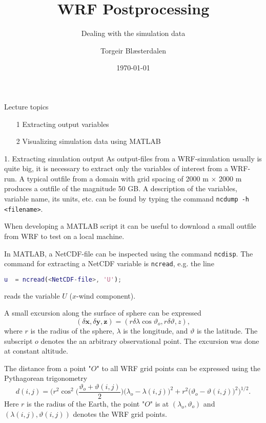 \documentclass{beamer}
\title{WRF Postprocessing}
\subtitle{Dealing with the simulation data}
\author{Torgeir Blæsterdalen}
\institute{Department of Industrial Engineering, UiT-The Arctic University of Norway}
\date{\today}
\newcommand{\yb}{\bm {y}\xspace}						%
\newcommand{\xb}{\bm {x}\xspace}						%
\newcommand{\zb}{\bm {z}\xspace}						%
\begin{document}
\begin{frame}
\titlepage
\end{frame}

\begin{frame}{Lecture topics}
\begin{enumerate}
	\item[1] Extracting output variables
	\item[2] Visualizing simulation data using MATLAB
\end{enumerate}
\end{frame}


\begin{frame}[fragile, allowframebreaks=1, t]{1. Extracting simulation output}
As output-files from a WRF-simulation usually is quite big, it is necessary to extract only the variables of interest from a WRF-run. A typical outfile from a domain with grid spacing of 2000 m $\times$ 2000 m produces a outfile of the magnitude 50 GB. 
A description of the variables, variable name, its units, etc. can be found by typing the command \texttt{ncdump -h <filename>}. 

When developing a MATLAB script it can be useful to download a small outfile from WRF to test on a local machine.

In MATLAB, a NetCDF-file can be inspected using the command \texttt{ncdisp}. The command for extracting a NetCDF variable is \texttt{ncread}, e.g. the line 
\begin{lstlisting}[language=MATLAB]
u  = ncread(<NetCDF-file>, 'U'); 
\end{lstlisting}
reads the variable $U$ ($x$-wind component). 

A small excursion along the surface of sphere can be expressed 
\begin{equation*}
(\delta \xb,\delta \yb, \zb) = (r\delta \lambda \cos \vartheta_o, r\delta\vartheta, z),	
\end{equation*} 
where $r$ is the radius of the sphere, $\lambda$ is the longitude, and $\vartheta$ is the latitude. The subscript $o$ denotes the an arbitrary observational point. The excursion was done at constant altitude. 

The distance from a point "$O$" to all WRF grid points can be expressed using the Pythagorean trigonometry 
\begin{equation}
d(i,j) = \Bigg(r^2\cos^2\bigg(\frac{\vartheta_o + \vartheta(i,j)}{2}\bigg)\big(\lambda_o-\lambda(i,j)\big)^2 + r^2\big(\vartheta_o - \vartheta(i,j)\big)^2 \Bigg)^{1/2}.
\label{DistanceToGridPoints}
\end{equation}
Here $r$ is the radius of the Earth, the point "$O$" is at $(\lambda_o,\vartheta_o)$ and $(\lambda(i,j),\vartheta(i,j))$ denotes the WRF grid points.


\end{frame}
\end{document}

